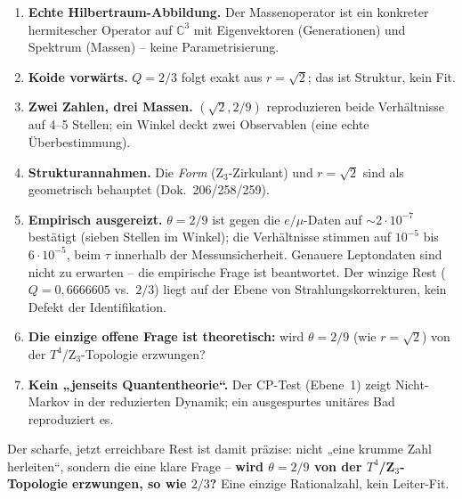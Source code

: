 \begin{important}
\begin{enumerate}
  \item \textbf{Echte Hilbertraum-Abbildung.} Der Massenoperator ist ein
        konkreter hermitescher Operator auf $\mathbb{C}^3$ mit Eigenvektoren
        (Generationen) und Spektrum (Massen) -- keine Parametrisierung.
  \item \textbf{Koide vorwärts.} $Q=2/3$ folgt exakt aus $r=\sqrt2$; das ist
        Struktur, kein Fit.
  \item \textbf{Zwei Zahlen, drei Massen.} $(\sqrt2,2/9)$ reproduzieren beide
        Verhältnisse auf 4--5 Stellen; ein Winkel deckt zwei Observablen
        (eine echte Überbestimmung).
  \item \textbf{Strukturannahmen.} Die \emph{Form} (Z$_3$-Zirkulant) und
        $r=\sqrt2$ sind als geometrisch behauptet (Dok.~206/258/259).
  \item \textbf{Empirisch ausgereizt.} $\theta=2/9$ ist gegen die
        $e/\mu$-Daten auf $\sim2\cdot10^{-7}$ bestätigt (sieben Stellen im
        Winkel); die Verhältnisse stimmen auf $10^{-5}$ bis $6\cdot10^{-5}$,
        beim $\tau$ innerhalb der Messunsicherheit. Genauere Leptondaten sind
        nicht zu erwarten -- die empirische Frage ist beantwortet. Der winzige
        Rest ($Q=0{,}6666605$ vs.\ $2/3$) liegt auf der Ebene von
        Strahlungskorrekturen, kein Defekt der Identifikation.
  \item \textbf{Die einzige offene Frage ist theoretisch:} wird $\theta=2/9$
        (wie $r=\sqrt2$) von der $T^4$/Z$_3$-Topologie erzwungen?
  \item \textbf{Kein „jenseits Quantentheorie``.} Der CP-Test (Ebene~1) zeigt
        Nicht-Markov in der reduzierten Dynamik; ein ausgespurtes unitäres Bad
        reproduziert es.
\end{enumerate}
\end{important}

Der scharfe, jetzt erreichbare Rest ist damit präzise: nicht „eine krumme Zahl
herleiten``, sondern die eine klare Frage -- \textbf{wird $\theta=2/9$ von der
$T^4$/Z$_3$-Topologie erzwungen, so wie $2/3$?} Eine einzige Rationalzahl, kein
Leiter-Fit.

